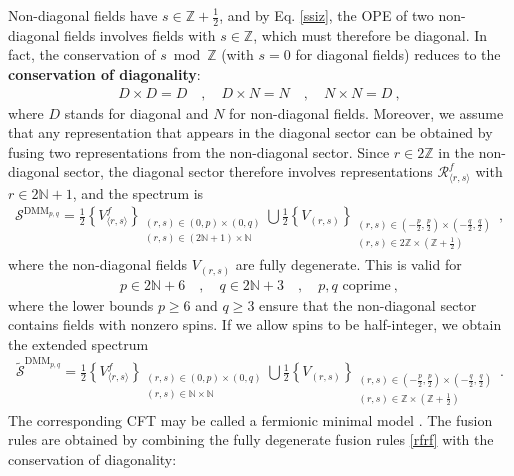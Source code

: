 \documentclass[12pt, a4paper]{article}
\theoremstyle{break}
\begin{document}
Non-diagonal fields have $s\in \mathbb{Z}+\frac12$, and by Eq. \eqref{ssiz}, the OPE of two non-diagonal fields involves fields with $s\in \mathbb{Z}$, which must therefore be diagonal. In fact, the conservation of $s\bmod \mathbb{Z}$ (with $s=0$ for diagonal fields) reduces to the \textbf{conservation of diagonality}:
\begin{align}
D\times D = D \quad , \quad D\times N = N \quad , \quad N\times N = D \ ,
\label{ddd}
\end{align}
where $D$ stands for diagonal and $N$ for non-diagonal fields. 
Moreover, we assume that any representation that appears in the diagonal sector can be obtained by fusing two representations from the non-diagonal sector. Since $r\in 2\mathbb{Z}$ in the non-diagonal sector, the diagonal sector therefore involves representations $\mathcal{R}^f_{\langle r,s\rangle}$ with $r\in 2\mathbb{N}+1$, and the spectrum is 
\begin{align}
 \boxed{\mathcal{S}^{\text{DMM}_{p,q}} = \frac12\left\{ V^f_{\langle r,s\rangle} \right\}_{\substack{(r,s)\in (0,p) \times (0,q)\\ (r,s)\in (2\mathbb{N}+1)\times \mathbb{N}}} 
 \bigcup 
 \frac12\left\{V_{(r,s)} \right\}_{\substack{(r,s)\in (-\frac{p}{2},\frac{p}{2})\times (-\frac{q}{2},\frac{q}{2})\\ (r,s)\in 2\mathbb{Z}\times (\mathbb{Z}+\frac12)}}
}\ ,
\label{sdmm}
\end{align}
where the non-diagonal fields $V_{(r,s)}$ are fully degenerate. This is valid for 
\begin{align}
 \boxed{p\in 2\mathbb{N}+6 \quad , \quad q \in 2\mathbb{N}+3 \quad ,\quad p,q\text{ coprime}} \ ,
\end{align}
where the lower bounds $p\geq 6$ and $q\geq 3$ ensure that the non-diagonal sector contains fields with nonzero spins. If we allow spins to be half-integer, we obtain the extended spectrum
\begin{align}
 \widetilde{\mathcal{S}}^{\text{DMM}_{p,q}} = \frac12\left\{ V^f_{\langle r,s\rangle} \right\}_{\substack{(r,s)\in (0,p) \times (0,q)\\ (r,s)\in \mathbb{N}\times \mathbb{N}}} 
 \bigcup 
 \frac12\left\{V_{(r,s)} \right\}_{\substack{(r,s)\in (-\frac{p}{2},\frac{p}{2})\times (-\frac{q}{2},\frac{q}{2})\\ (r,s)\in \mathbb{Z}\times (\mathbb{Z}+\frac12)}}
\ .
\end{align}
The corresponding CFT may be called a fermionic minimal model \cite{rw20}. The fusion rules are obtained by combining the fully degenerate fusion rules \eqref{rfrf} with the conservation of diagonality:
\end{document}
